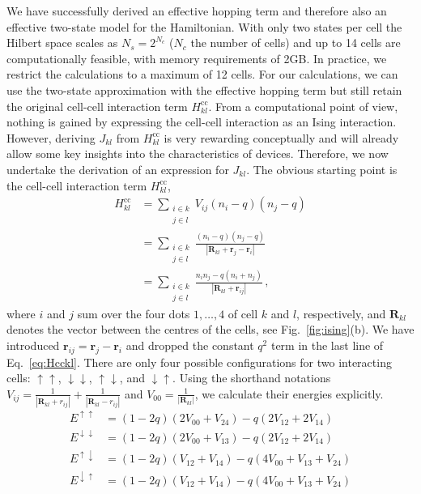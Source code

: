 We have successfully derived an effective hopping term and therefore also an
effective two-state model for the  Hamiltonian. With only two states
per cell the Hilbert space scales as $N_s = 2^{N_c}$ ($N_c$ the number of cells)
and up to 14 cells are computationally feasible, with memory requirements of
2GB. In practice, we restrict the calculations to a maximum of 12 cells. For our
calculations, we can use the two-state approximation with the effective hopping
term but still retain the original cell-cell interaction term $H^\text{cc}_{kl}$.
From a computational point of view, nothing is gained by expressing the
cell-cell interaction as an Ising interaction. However, deriving $J_{kl}$ from
$H^\text{cc}_{kl}$ is very rewarding conceptually and will already allow some key
insights into the characteristics of  devices. Therefore, we now
undertake the derivation of an expression for $J_{kl}$. The obvious starting
point is the cell-cell interaction term $H^\text{cc}_{kl}$, 
%
\begin{equation}
\begin{split}
\label{eq:Hcckl}
  H^\text{cc}_{kl} 
  &=
  \sum_{\substack{i \in k\\j \in l}} V_{ij} \left( n_i - q \right) \left( n_j - q \right) \\
  &= 
  \sum_{\substack{i \in k\\j \in l}}
  \frac{ \left( n_i - q \right) \left( n_j - q \right) }
       { \left| \bm{R}_{kl} + \bm{r}_j - \bm{r}_i \right| } \\
  &=
  \sum_{\substack{i \in k\\j \in l}}
  \frac{n_i n_j - q (n_i + n_j)}
       {\left| \bm{R}_{kl} + \bm{r}_{ij} \right|} \, ,
\end{split}
\end{equation}
%
where $i$ and $j$ sum over the four dots $1, \ldots, 4$ of cell $k$ and $l$,
respectively, and $\bm{R}_{kl}$ denotes the vector between the centres of the
cells, see Fig.~\ref{fig:ising}(b). We have introduced $\bm{r}_{ij} = \bm{r}_j -
\bm{r}_i$ and dropped the constant $q^2$ term in the last line of
Eq.~\eqref{eq:Hcckl}. There are only four possible configurations for two
interacting cells: $\uparrow\uparrow$, $\downarrow\downarrow$,
$\uparrow\downarrow$, and $\downarrow\uparrow$. Using the shorthand notations
$V_{ij} = \frac{1}{\left| \bm{R}_{kl} + r_{ij} \right|} + \frac{1}{\left|
\bm{R}_{kl} - r_{ij} \right|}$ and $V_{00} = \frac{1}{\left| \bm{R}_{kl}
\right|}$, we calculate their energies explicitly.
\begin{align}
  E^{\uparrow\uparrow}
  &=
  \left( 1 - 2 q \right) \left( 2 V_{00} + V_{24} \right)
  - q \left( 2 V_{12} + 2 V_{14} \right)
  \\
  E^{\downarrow\downarrow}
  &=
  \left( 1 - 2 q \right) \left( 2 V_{00} + V_{13} \right)
  - q \left( 2 V_{12} + 2 V_{14} \right)
  \\
  E^{\uparrow\downarrow}
  &=
  \left( 1 - 2 q \right) \left( V_{12} + V_{14} \right)
  - q \left( 4 V_{00} + V_{13} + V_{24} \right)
  \\
  E^{\downarrow\uparrow}
  &=
  \left( 1 - 2 q \right) \left( V_{12} + V_{14} \right)
  - q \left( 4 V_{00} + V_{13} + V_{24} \right)
\end{align}
